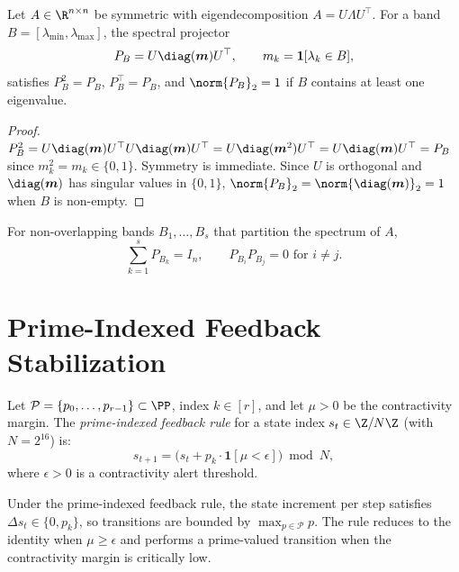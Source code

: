 \documentclass[11pt]{article}
\begin{document}
\begin{theorem}
\label{thm:specproj}
Let $A\in\R^{n\times n}$ be symmetric with eigendecomposition
$A = U\Lambda U^\top$.  For a band $B = [\lambda_{\min},\lambda_{\max}]$, the
spectral projector
\[
  P_B = U\diag(\bm{m}) U^\top, \qquad m_k = \mathbf{1}[\lambda_k\in B],
\]
satisfies $P_B^2 = P_B$, $P_B^\top = P_B$, and
$\norm{P_B}_2 = 1$ if $B$ contains at least one eigenvalue.
\end{theorem}

\begin{proof}
$P_B^2 = U\diag(\bm{m})U^\top U\diag(\bm{m})U^\top
        = U\diag(\bm{m}^2)U^\top = U\diag(\bm{m})U^\top = P_B$
since $m_k^2 = m_k\in\{0,1\}$.  Symmetry is immediate.  Since $U$ is
orthogonal and $\diag(\bm{m})$ has singular values in $\{0,1\}$,
$\norm{P_B}_2 = \norm{\diag(\bm{m})}_2 = 1$ when $B$ is non-empty.
\end{proof}

\begin{corollary}
For non-overlapping bands $B_1,\dots,B_s$ that partition the spectrum of $A$,
\[
  \sum_{k=1}^s P_{B_k} = I_n, \qquad P_{B_i}P_{B_j} = 0 \text{ for } i\neq j.
\]
\end{corollary}

\section{Prime-Indexed Feedback Stabilization}

\begin{definition}
Let $\mathcal{P}=\{p_0,\dots,p_{r-1}\}\subset\PP$, index $k\in[r]$, and
let $\mu>0$ be the contractivity margin.  The \emph{prime-indexed feedback
rule} for a state index $s_t\in\Z/N\Z$ (with $N=2^{16}$) is:
\[
  s_{t+1} = \bigl(s_t + p_k \cdot \mathbf{1}[\mu < \epsilon]\bigr) \bmod N,
\]
where $\epsilon>0$ is a contractivity alert threshold.
\end{definition}

\begin{proposition}
Under the prime-indexed feedback rule, the state increment per step satisfies
$\Delta s_t \in \{0, p_k\}$, so transitions are bounded by
$\max_{p\in\mathcal{P}} p$.  The rule reduces to the identity when
$\mu \geq \epsilon$ and performs a prime-valued transition when the
contractivity margin is critically low.
\end{proposition}
\end{document}
